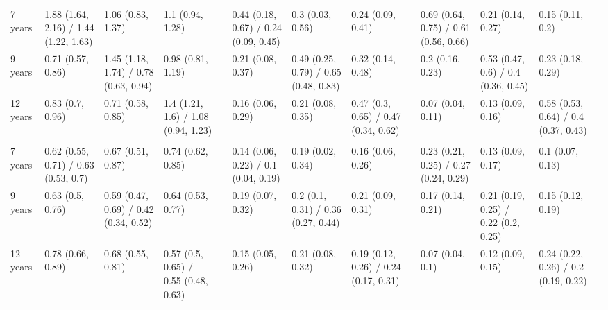 \begin{tabular}{llllrlllrlllr}
  \cmidrule{1-12}    7 years & 1.88 (1.64, 2.16) / 1.44 (1.22, 1.63) & 1.06 (0.83, 1.37) & 1.1 (0.94, 1.28) &       & 0.44 (0.18, 0.67) / 0.24 (0.09, 0.45) & 0.3 (0.03, 0.56) & 0.24 (0.09, 0.41) &       & 0.69 (0.64, 0.75) / 0.61 (0.56, 0.66) & 0.21 (0.14, 0.27) & 0.15 (0.11, 0.2) &  \\
  9 years & 0.71 (0.57, 0.86) & 1.45 (1.18, 1.74) / 0.78 (0.63, 0.94) & 0.98 (0.81, 1.19) &       & 0.21 (0.08, 0.37) & 0.49 (0.25, 0.79) / 0.65 (0.48, 0.83) & 0.32 (0.14, 0.48) &       & 0.2 (0.16, 0.23) & 0.53 (0.47, 0.6) / 0.4 (0.36, 0.45) & 0.23 (0.18, 0.29) &  \\
  12 years & 0.83 (0.7, 0.96) & 0.71 (0.58, 0.85) & 1.4 (1.21, 1.6) / 1.08 (0.94, 1.23) &       & 0.16 (0.06, 0.29) & 0.21 (0.08, 0.35) & 0.47 (0.3, 0.65) / 0.47 (0.34, 0.62) &       & 0.07 (0.04, 0.11) & 0.13 (0.09, 0.16) & 0.58 (0.53, 0.64) / 0.4 (0.37, 0.43) &  \\
  & \multicolumn{3}{c}{}  &       & \multicolumn{3}{c}{}  &       & \multicolumn{3}{c}{}  &  \\
  7 years & 0.62 (0.55, 0.71) / 0.63 (0.53, 0.7) & 0.67 (0.51, 0.87) & 0.74 (0.62, 0.85) &       & 0.14 (0.06, 0.22) / 0.1 (0.04, 0.19) & 0.19 (0.02, 0.34) & 0.16 (0.06, 0.26) &       & 0.23 (0.21, 0.25) / 0.27 (0.24, 0.29) & 0.13 (0.09, 0.17) & 0.1 (0.07, 0.13) &  \\
  9 years & 0.63 (0.5, 0.76) & 0.59 (0.47, 0.69) / 0.42 (0.34, 0.52) & 0.64 (0.53, 0.77) &       & 0.19 (0.07, 0.32) & 0.2 (0.1, 0.31) / 0.36 (0.27, 0.44) & 0.21 (0.09, 0.31) &       & 0.17 (0.14, 0.21) & 0.21 (0.19, 0.25) / 0.22 (0.2, 0.25) & 0.15 (0.12, 0.19) &  \\
  12 years & 0.78 (0.66, 0.89) & 0.68 (0.55, 0.81) & 0.57 (0.5, 0.65) / 0.55 (0.48, 0.63) &       & 0.15 (0.05, 0.26) & 0.21 (0.08, 0.32) & 0.19 (0.12, 0.26) / 0.24 (0.17, 0.31) &       & 0.07 (0.04, 0.1) & 0.12 (0.09, 0.15) & 0.24 (0.22, 0.26) / 0.2 (0.19, 0.22) &  \\
  \bottomrule
\end{tabular}%
